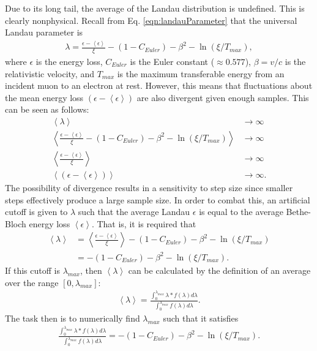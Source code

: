 Due to its long tail, the average of the Landau distribution is undefined. This is clearly nonphysical. Recall from Eq. \eqref{eqn:landauParameter} that the universal Landau parameter is
\begin{align*}
\lambda=\frac{\epsilon-\left<\epsilon\right>}{\xi}-(1-C_{Euler})-\beta ^2 -\ln (\xi/T_{max}),
\end{align*}
where $\epsilon$ is the energy loss, $C_{Euler}$ is the Euler constant ($\approx 0.577$), $\beta=v/c$ is the relativistic velocity, and $T_{max}$ is the maximum transferable energy from an incident muon to an electron at rest. However, this means that fluctuations about the mean energy loss $\left(\epsilon-\left<\epsilon\right>\right)$ are also divergent given enough samples. This can be seen as follows:
\begin{align*}
\left<\lambda\right>&\rightarrow\infty\\
\left<\frac{\epsilon-\left<\epsilon\right>}{\xi}-(1-C_{Euler})-\beta ^2 -\ln (\xi/T_{max})\right>&\rightarrow\infty\\
\left<\frac{\epsilon-\left<\epsilon\right>}{\xi}\right>&\rightarrow\infty\\
\left<\left(\epsilon-\left<\epsilon\right>\right)\right>&\rightarrow\infty.
\end{align*}
The possibility of divergence results in a sensitivity to step size since smaller steps effectively produce a large sample size. In order to combat this, an artificial cutoff is given to $\lambda$ such that the average Landau $\epsilon$ is equal to the average Bethe-Bloch energy loss $\left<\epsilon\right>$. That is, it is required that
\begin{align*}
\left<\lambda\right>&=\left<\frac{\epsilon-\left<\epsilon\right>}{\xi}\right>-(1-C_{Euler})-\beta^2-\ln(\xi/T_{max})\\
&=-(1-C_{Euler})-\beta^2-\ln(\xi/T_{max}).
\end{align*}
If this cutoff is $\lambda_{max}$, then $\left<\lambda\right>$ can be calculated by the definition of an average over the range $[0,\lambda_{max}]$:
\begin{align*}
\left<\lambda\right>=\frac{\int_0 ^{\lambda_{max}} \lambda * f(\lambda) d\lambda}{\int_0 ^{\lambda_{max}}f(\lambda) d\lambda}.
\end{align*}
The task then is to numerically find $\lambda_{max}$ such that it satisfies
\begin{align*}
\frac{\int_0 ^{\lambda_{max}} \lambda * f(\lambda) d\lambda}{\int_0 ^{\lambda_{max}}f(\lambda) d\lambda}=-(1-C_{Euler})-\beta^2-\ln(\xi/T_{max}).
\end{align*}
